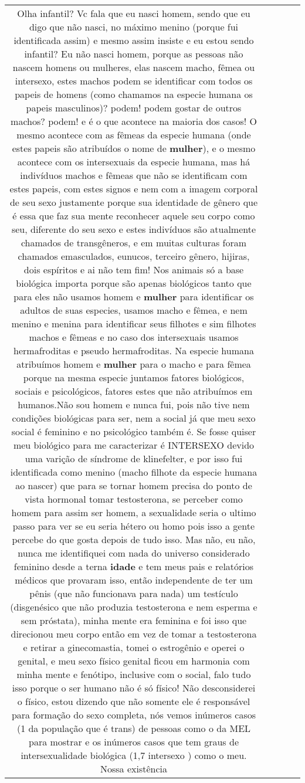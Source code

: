 \documentclass[11pt]{article}
\newlength\mylength
\begin{document}
\begin{center}
\begin{longtable}{|C{.65\mylength}|C{.30\mylength}|C{.12\mylength}|C{.12\mylength}|C{.12\mylength}|}
  \small Olha infantil? Vc fala que eu nasci homem, sendo que eu digo que não nasci, no máximo menino (porque fui identificada assim) e mesmo assim insiste e eu estou sendo infantil? Eu não nasci homem, porque as pessoas não nascem homens ou mulheres, elas nascem macho, fêmea ou intersexo,  estes machos podem se identificar com todos os papeis de homens (como chamamos na especie humana os papeis masculinos)? podem! podem gostar de outros machos? podem! e é o que acontece na maioria dos casos! O mesmo acontece com as fêmeas da especie humana (onde estes papeis são atribuídos o nome de \textbf{mulher}), e o mesmo acontece com os intersexuais da especie humana, mas há indivíduos machos e fêmeas que não se identificam com estes papeis, com estes signos e nem com a imagem corporal de seu sexo justamente porque sua identidade de gênero que é essa que faz sua mente reconhecer aquele seu corpo como seu, diferente do seu sexo e estes indivíduos são atualmente chamados de transgêneros, e em muitas culturas foram chamados emasculados, eunucos, terceiro gênero, hijiras, dois espíritos e ai não tem fim! Nos animais só a base biológica importa porque são apenas biológicos tanto que para eles não usamos homem e \textbf{mulher} para identificar os adultos de suas especies, usamos macho e fêmea, e nem menino e menina para identificar seus filhotes e sim filhotes machos e fêmeas e no caso dos intersexuais usamos hermafroditas e pseudo hermafroditas. Na especie humana atribuímos homem e \textbf{mulher} para o macho e para fêmea porque na mesma especie juntamos fatores biológicos, sociais e psicológicos, fatores estes que não atribuímos em humanos.Não sou homem e nunca fui, pois não tive nem condições biológicas para ser, nem a social já que meu sexo social é feminino e no psicológico também é. Se fosse quiser meu biológico para me caracterizar é INTERSEXO devido uma varição de síndrome de klinefelter, e por isso fui identificada como menino (macho filhote da especie humana ao nascer) que para se tornar homem precisa do ponto de vista hormonal tomar testosterona, se perceber como homem para assim ser homem, a sexualidade seria o ultimo passo para ver se eu seria hétero ou homo pois isso a gente percebe do que gosta depois de tudo isso. Mas não, eu não, nunca me identifiquei com nada do universo considerado feminino desde a terna \textbf{idade} e tem meus pais e relatórios médicos que provaram isso, então independente de ter um pênis (que não funcionava para nada) um testículo (disgenésico que não produzia testosterona e nem esperma e sem próstata), minha mente era feminina e foi isso que direcionou meu corpo então em vez de tomar a testosterona e retirar a ginecomastia, tomei o estrogênio e  operei o genital, e meu sexo físico genital ficou em harmonia com minha mente e fenótipo, inclusive com o social, falo tudo isso porque o ser humano não é só físico! Não desconsiderei o físico, estou dizendo que não somente ele é responsável para formação do sexo completa, nós vemos inúmeros casos (1 da população que é trans) de pessoas como o da MEL para mostrar  e os inúmeros casos que tem graus de intersexualidade biológica (1,7 intersexo ) como o meu. Nossa existência 
\end{longtable}
\end{center}
\end{document}
